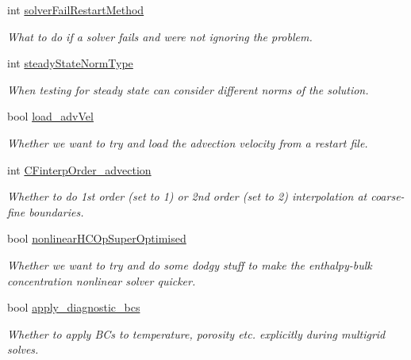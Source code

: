 \begin{DoxyCompactItemize}
\mbox{\label{struct_mushy_layer_options_abf11a35aae07875e68c218024cf8bc73}} 
int \hyperlink{struct_mushy_layer_options_abf11a35aae07875e68c218024cf8bc73}{solver\+Fail\+Restart\+Method}
\begin{DoxyCompactList}\small\item\em What to do if a solver fails and we\textquotesingle{}re not ignoring the problem. \end{DoxyCompactList}\item 
int \hyperlink{struct_mushy_layer_options_a8215f286dafdbe573df73258b544f307}{steady\+State\+Norm\+Type}
\begin{DoxyCompactList}\small\item\em When testing for steady state can consider different norms of the solution. \end{DoxyCompactList}\item 
bool \hyperlink{struct_mushy_layer_options_a6cf246b25ca25948fa22e673b62ca017}{load\+\_\+adv\+Vel}
\begin{DoxyCompactList}\small\item\em Whether we want to try and load the advection velocity from a restart file. \end{DoxyCompactList}\item 
\mbox{\label{struct_mushy_layer_options_a1689abf88e2e066a61b4c0108618ac9e}} 
int \hyperlink{struct_mushy_layer_options_a1689abf88e2e066a61b4c0108618ac9e}{C\+Finterp\+Order\+\_\+advection}
\begin{DoxyCompactList}\small\item\em Whether to do 1st order (set to 1) or 2nd order (set to 2) interpolation at coarse-\/fine boundaries. \end{DoxyCompactList}\item 
bool \hyperlink{struct_mushy_layer_options_a5e66ad315df2dbff60ee56ea25ed68ae}{nonlinear\+H\+C\+Op\+Super\+Optimised}
\begin{DoxyCompactList}\small\item\em Whether we want to try and do some dodgy stuff to make the enthalpy-\/bulk concentration nonlinear solver quicker. \end{DoxyCompactList}\item 
bool \hyperlink{struct_mushy_layer_options_a078a1ef21c19a8b1eb903f0c5c90ad4f}{apply\+\_\+diagnostic\+\_\+bcs}
\begin{DoxyCompactList}\small\item\em Whether to apply B\+Cs to temperature, porosity etc. explicitly during multigrid solves. \end{DoxyCompactList}\item 

\end{DoxyCompactItemize}
